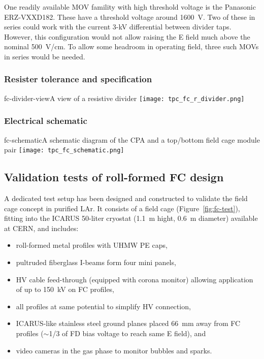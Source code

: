 One readily available MOV famility  with high threshold voltage is the Panasonic ERZ-VXXD182.  These have a threshold voltage around 1600~V.  Two of these in series could work with the current 3-kV differential between divider taps.  However, this configuration would not allow raising the E field much above the nominal 500~V/cm.  To allow some headroom in operating field, three such MOVs in series would be needed.


\subsubsection{Resister tolerance and specification}

\begin{cdrfigure}{fc-divider-view}{A view of a resistive divider}
\texttt{[image: tpc\_fc\_r\_divider.png]}
\end{cdrfigure}

\subsubsection{Electrical schematic}
 
\begin{cdrfigure}{fc-schematic}{A schematic diagram of the CPA and a top/bottom field cage module pair}
\texttt{[image: tpc\_fc\_schematic.png]}
\end{cdrfigure}

\subsection{Validation tests of roll-formed FC design}

A dedicated test setup has been designed and constructed to validate the field cage concept  in purified LAr.
It consists of a field cage (Figure~\ref{fig:fc-test}), fitting into the ICARUS 50-liter cryostat (1.1~m hight, 0.6~m diameter) available at CERN, and  includes:

\begin{itemize}	
\item roll-formed metal profiles with UHMW PE caps,
\item pultruded fiberglass I-beams form four mini panels,
\item HV cable feed-through (equipped with corona monitor) allowing application of up to 150~kV on FC profiles,
\item all profiles at same potential to simplify HV connection,
\item ICARUS-like stainless steel ground planes placed  66~mm away from FC profiles ($\sim$1/3 of FD bias voltage to reach
same E field), and
\item video cameras in the gas phase to monitor bubbles and sparks.
\end{itemize}

